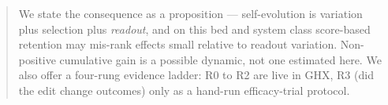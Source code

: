 \begin{abstract}
We state the consequence as a proposition --- self-evolution is variation
plus selection plus \emph{readout}, and on this bed and system class
score-based retention may mis-rank effects small relative to readout
variation. Non-positive cumulative gain is a possible dynamic, not one
estimated here. We also offer a four-rung evidence ladder: R0 to R2 are
live in GHX, R3 (did the edit change outcomes) only as a hand-run
efficacy-trial protocol.
\end{abstract}
